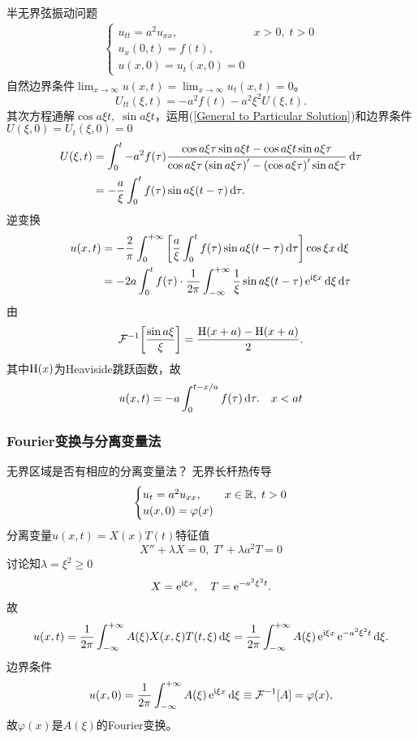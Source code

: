 \eg 半无界弦振动问题
\begin{align*}
	\begin{cases}
		u_{tt}=a^2u_{xx},& x>0,\;t>0\\
		u_x(0,t)=f(t),\\ %
		u(x,0)=u_t(x,0)=0
	\end{cases}
\end{align*}
自然边界条件$\lim_{x\to\infty}u(x,t)=\lim_{x\to\infty}u_t(x,t)=0$。
\[U_{tt}(\xi,t)=-a^2f(t)-a^2\xi^2U(\xi,t).\]
其次方程通解$\cos a\xi t,\;\sin a\xi t$，运用(\ref{General to Particular Solution})和边界条件$U(\xi,0)=U_t(\xi,0)=0$
\begin{align*}
	U(\xi,t)&=\int_0^t-a^2f(\tau)\frac{\cos a\xi\tau\sin a\xi t-\cos a\xi t\sin a\xi\tau}{\cos a\xi\tau\left(\sin a\xi\tau\right)'-\left(\cos a\xi\tau\right)'\sin a\xi\tau}\mathop{}\!\mathrm{d}\tau\\
	&=-\frac a\xi\int_0^tf(\tau)\sin a\xi(t-\tau)\mathop{}\!\mathrm{d}\tau.
\end{align*}
逆变换
\begin{align*}
	u(x,t)&=-\frac{2}\pi\int_0^{+\infty}\left[\frac a\xi\int_0^tf(\tau)\sin a\xi(t-\tau)\mathop{}\!\mathrm{d}\tau\right]\cos \xi x\mathop{}\!\mathrm{d}\xi\\
	&=-2a\int_0^tf(\tau)\cdot\frac1{2\pi}\int_{-\infty}^{+\infty}\frac1\xi\sin a\xi(t-\tau)\mathop{}\!\mathrm{e}^{\mathrm{i}\xi x}\mathop{}\!\mathrm{d}\xi\mathop{}\!\mathrm{d}\tau
\end{align*}
由
\[\mathcal F_\mathrm{\!\,}^{-1}\!\left[\frac{\sin a\xi}\xi\right]=\frac{\operatorname{H}(x+a)-\operatorname{H}(x+a)}2.\]
其中$\operatorname{H}(x)$为Heaviside跳跃函数，故
\begin{align*}
	u(x,t) %
	=-a\int_0^{t-x/a}f(\tau)\d\tau.\quad x<at
\end{align*}
\subsubsection{Fourier变换与分离变量法}
无界区域是否有相应的分离变量法？
\eg 无界长杆热传导
\begin{align*}
	\begin{cases}
		u_t=a^2u_{xx},& x\in\mathbb R,\;t>0\\
		u(x,0)=\varphi(x)
	\end{cases}
\end{align*}
分离变量$u(x,t)=X(x)T(t)$特征值
\[X''+\lambda X=0,\;T'+\lambda a^2T=0\]
讨论知$\lambda=\xi^2\geqslant 0$
\[X=\mathop{}\!\mathrm{e}^{\mathrm{i}\xi x},\quad T=\mathop{}\!\mathrm{e}^{-a^2\xi^2t}.\]
故
\[u(x,t)=\frac1{2\pi}\int_{-\infty}^{+\infty} A(\xi)X(x,\xi)T(t,\xi)\mathop{}\!\mathrm{d}\xi=\frac1{2\pi}\int_{-\infty}^{+\infty} A(\xi)\mathop{}\!\mathrm{e}^{\mathrm{i}\xi x}\mathop{}\!\mathrm{e}^{-a^2\xi^2t}\mathop{}\!\mathrm{d}\xi.\]
边界条件
\[u(x,0)=\frac1{2\pi}\int_{-\infty}^{+\infty} A(\xi)\mathop{}\!\mathrm{e}^{\mathrm{i}\xi x}\mathop{}\!\mathrm{d}\xi\equiv\mathcal F_\mathrm{\!\,}^{-1}\!\left[A\right]=\varphi(x),\]
故$\varphi(x)$是$A(\xi)$的Fourier变换。

